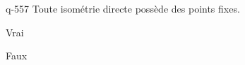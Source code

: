 \begin{truefalse}{q-557}
Toute isométrie directe possède des points fixes.
\item Vrai
\item* Faux
\end{truefalse}

